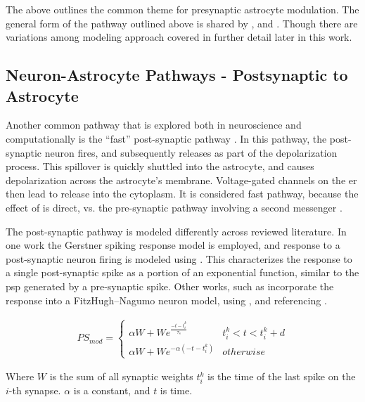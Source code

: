     The above outlines the common theme for presynaptic astrocyte
    modulation. The general form of the pathway outlined above is shared by
    \parencite{postnov_2009}, and \parencite{wade_2011}. Though there are
    variations among modeling approach covered in further detail later in this
    work.

    \subsection{Neuron-Astrocyte Pathways - Postsynaptic to Astrocyte}
    Another common pathway that is explored both in neuroscience and
    computationally is the ``fast'' post-synaptic pathway \parencite{bassam_2015}. In
    this pathway, the post-synaptic neuron fires, and subsequently releases \kp
    as part of the depolarization process. This \kp spillover is quickly shuttled
    into the astrocyte, and causes depolarization across the astrocyte's
    membrane. Voltage-gated channels on the \gls{er} then lead to \ca release into
    the cytoplasm. It is considered fast pathway, because the effect of \kp is
    direct, vs. the pre-synaptic pathway involving a second messenger
    \parencite{bassam_2015}.

    The post-synaptic pathway is modeled differently across reviewed
    literature. In one work \parencite{bassam_2015} the Gerstner spiking
    response model is employed, and \ca response to a post-synaptic neuron
    firing is modeled using . This characterizes
    the response to a single post-synaptic spike as a portion of an exponential
    function, similar to the \gls{psp} generated by a pre-synaptic spike. Other
    works, such as \parencite{postnov_2007} incorporate the \ca response into a
    FitzHugh–Nagumo neuron model, using , and
    referencing .

    \begin{align}
        PS_{mod} =
        \begin{cases}
          \alpha W + We^{\frac{-t - t^k_{i}}{\tau_s}} & t^k_{i} < t < t^k_{i}
          + d \\
          \alpha W + We^{-\alpha (-t - t^k_{i})} & otherwise
       \end{cases} \label{eq:kp_path_srm}      
    \end{align}

    Where $W$ is the sum of all synaptic weights $t^k_i$ is the time of the last
    spike on the $i$-th synapse. $\alpha$ is a constant, and $t$ is time.

